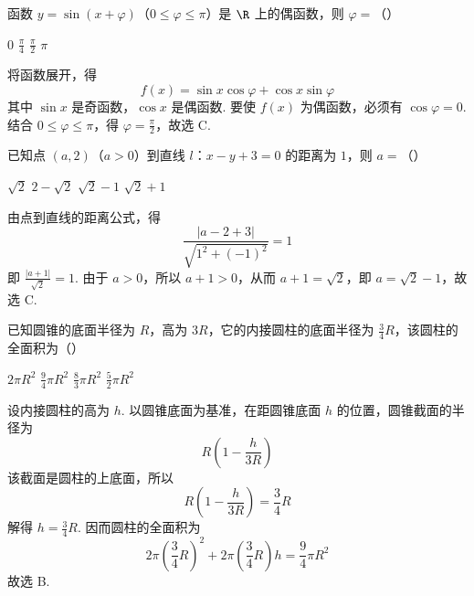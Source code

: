 \begin{problem}
函数 \(y=\sin(x+\varphi)\)（\(0\leqslant\varphi\leqslant\pi\)）是 \(\R\) 上的偶函数，则 \(\varphi=\)（\quad）

\choices
    {\(0\)}
    {\(\frac\pi4\)}
    {\(\frac\pi2\)}
    {\(\pi\)}

\begin{solution}
将函数展开，得
\[
f(x)=\sin x\cos\varphi+\cos x\sin\varphi
\]
其中 \(\sin x\) 是奇函数，\(\cos x\) 是偶函数. 要使 \(f(x)\) 为偶函数，必须有 \(\cos\varphi=0\). 结合 \(0\leqslant\varphi\leqslant\pi\)，得 \(\varphi=\frac\pi2\)，故选 C.
\end{solution}
\end{problem}

\begin{problem}
已知点 \((a,2)\)（\(a>0\)）到直线 \(l\)：\(x-y+3=0\) 的距离为 \(1\)，则 \(a=\)（\quad）

\choices
    {\(\sqrt2\)}
    {\(2-\sqrt2\)}
    {\(\sqrt2-1\)}
    {\(\sqrt2+1\)}

\begin{solution}
由点到直线的距离公式，得
\[
\frac{|a-2+3|}{\sqrt{1^2+(-1)^2}}=1
\]
即 \(\frac{|a+1|}{\sqrt2}=1\). 由于 \(a>0\)，所以 \(a+1>0\)，从而 \(a+1=\sqrt2\)，即 \(a=\sqrt2-1\)，故选 C.
\end{solution}
\end{problem}

\begin{problem}
已知圆锥的底面半径为 \(R\)，高为 \(3R\)，它的内接圆柱的底面半径为 \(\frac34R\)，该圆柱的全面积为（\quad）

\choices
    {\(2\pi R^2\)}
    {\(\frac94\pi R^2\)}
    {\(\frac83\pi R^2\)}
    {\(\frac52\pi R^2\)}

\begin{solution}
设内接圆柱的高为 \(h\). 以圆锥底面为基准，在距圆锥底面 \(h\) 的位置，圆锥截面的半径为
\[
R\left(1-\frac{h}{3R}\right)
\]
该截面是圆柱的上底面，所以
\[
R\left(1-\frac{h}{3R}\right)=\frac34R
\]
解得 \(h=\frac34R\). 因而圆柱的全面积为
\[
2\pi\left(\frac34R\right)^2+2\pi\left(\frac34R\right)h
=\frac94\pi R^2
\]
故选 B.
\end{solution}
\end{problem}

